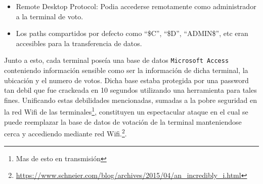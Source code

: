 \begin{itemize}
	\item Remote Desktop Protocol: Podia accederse remotamente como administrador a la terminal de voto.
	\item Los paths compartidos por defecto como ``\$C'', ``\$D'', ``ADMIN\$'', etc eran accesibles para la transferencia de datos.
\end{itemize} 

Junto a esto, cada terminal poseía una base de datos \texttt{Microsoft Access} conteniendo información sensible como ser la información de dicha terminal, la ubicación y el numero de votos. Dicha base estaba protegida por una password tan debil que fue crackeada en 10 segundos utilizando una herramienta para tales fines.
Unificando estas debilidades mencionadas, sumadas a la pobre seguridad en la red Wifi de las terminales\footnote{Mas de esto en transmisión}, constituyen un espectacular ataque en el cual se puede reemplazar la base de datos de votación de la terminal manteniendose cerca y accediendo mediante red Wifi.\footnote{\url{https://www.schneier.com/blog/archives/2015/04/an_incredibly_i.html}}.





